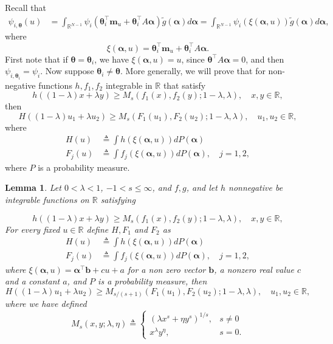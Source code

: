 \documentclass{article} %
\newtheorem{lemma}[theorem]{Lemma}
\begin{document}
Recall that
\begin{align}
\psi_{i,\boldsymbol{\theta}}(u)&= \int_{\mathbb{R}^{N-1}} \psi_i\left(\boldsymbol{\theta}_i^{\top}\mathbf{m}_u+\boldsymbol{\theta}_i^{\top}A \boldsymbol{\alpha}\right) \tilde{g}(\boldsymbol{\alpha})d\boldsymbol{\alpha}\nonumber= \int_{\mathbb{R}^{N-1}} \psi_i\left(\xi(\boldsymbol{\alpha},u)\right) \tilde{g}(\boldsymbol{\alpha})d\boldsymbol{\alpha},\nonumber
\end{align}
where
$$
\xi(\boldsymbol{\alpha},u) = \boldsymbol{\theta}_i^{\top}\mathbf{m}_u+\boldsymbol{\theta}_i^{\top}A \boldsymbol{\alpha}.
$$
First note that if $\boldsymbol{\theta} = \boldsymbol{\theta}_i$, we have $\xi(\boldsymbol{\alpha},u) = u$, since $\boldsymbol{\theta}^{\top}A\boldsymbol{\alpha} =0$, and then $\psi_{i,\boldsymbol{\theta}_i} = \psi_i$. Now suppose $\boldsymbol{\theta}_i \neq \boldsymbol{\theta}$. More generally, we will prove that for non-negative functions $h,f_1,f_2$ integrable in $\mathbb{R}$ that satisfy 
$$
h((1-\lambda) x+\lambda y) \geq M_s(f_1(x), f_2(y) ; 1-\lambda, \lambda), \quad x, y \in \mathbb{R},
$$
then 
$$
H\left((1-\lambda) u_1+\lambda u_2\right) \geq M_{s}\left(F_1\left(u_1\right), F_2\left(u_2\right) ; 1-\lambda, \lambda\right), \quad u_1, u_2 \in \mathbb{R},
$$
where
\begin{align*}
H(u)  &\triangleq  \int h(\xi(\boldsymbol{\alpha},u)) dP(\boldsymbol{\alpha})\nonumber\\
F_j(u)  &\triangleq  \int f_j(\xi(\boldsymbol{\alpha},u)) dP(\boldsymbol{\alpha}), \quad j = 1,2,
\end{align*}
where $P$ is a probability measure.

\begin{lemma}\label{lemma:Lieb}
Let $0<\lambda<1$, $-1 < s \leq \infty$, and $f, g$, and let $h$ nonnegative be integrable functions on $\mathbb{R}$ satisfying

$$
h((1-\lambda) x+\lambda y) \geq M_s(f_1(x), f_2(y) ; 1-\lambda, \lambda), \quad x, y \in \mathbb{R},
$$
For every fixed $u \in \mathbb{R}$ define $H,F_1$ and $F_2$ as 
\begin{align*}
H(u)  &\triangleq  \int h(\xi(\boldsymbol{\alpha},u)) dP(\boldsymbol{\alpha})\nonumber\\
F_j(u)  &\triangleq  \int f_j(\xi(\boldsymbol{\alpha},u)) dP(\boldsymbol{\alpha}), \quad j = 1,2,
\end{align*}
where $\xi(\boldsymbol{\alpha},u) = \boldsymbol{\alpha}^{\top}\mathbf{b}+ cu+a$ for a non zero vector $\mathbf{b}$, a nonzero real value $c$ and a constant $a$, and $P$ is a probability measure, then
$$
H\left((1-\lambda) u_1+\lambda u_2\right) \geq M_{s /(s+1)}\left(F_1\left(u_1\right), F_2\left(u_2\right) ; 1-\lambda, \lambda\right), \quad u_1, u_2 \in \mathbb{R},
$$
where we have defined
$$
M_s(x, y ; \lambda,\eta) \triangleq  \begin{cases}\left(\lambda x^s+\eta y^s\right)^{1 / s}, & s \neq 0 
\\ x^{\lambda} y^{\eta}, & s=0.
\end{cases}
$$
\end{lemma}
\end{document}

